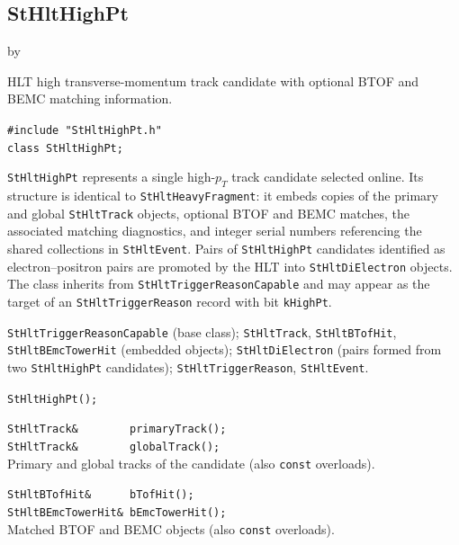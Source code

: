 \documentclass[twoside]{article}
\newcommand{\entrylabel}[1]{\mbox{\textbf{{#1}}}\hfil}%
\newenvironment{entry}
{\begin{list}{}%
    {\renewcommand{\makelabel}{\entrylabel}%
     \setlength{\labelwidth}{90pt}%
     \setlength{\leftmargin}{\labelwidth}
     \advance\leftmargin by \labelsep%
      }%
    }%
  {\end{list}}
\newcommand{\Entrylabel}[1]%
{\raisebox{0pt}[1ex][0pt]{\makebox[\labelwidth][l]%
    {\parbox[t]{\labelwidth}{\hspace{0pt}\textbf{{#1}}}}}}
\newenvironment{Entry}%
{\renewcommand{\entrylabel}{\Entrylabel}\begin{entry}}%
  {\end{entry}}
\begin{document}
\subsection{StHltHighPt}
\label{sec:StHltHighPt}
\begin{Entry}
\item[Summary] HLT high transverse-momentum track candidate with optional
    BTOF and BEMC matching information.
\item[Synopsis]
    \verb+#include "StHltHighPt.h"+\\
    \verb+class StHltHighPt;+\\
\item[Description]
    \texttt{StHltHighPt} represents a single high-$p_T$ track candidate
    selected online.  Its structure is identical to
    \texttt{StHltHeavyFragment}: it embeds copies of the primary and
    global \texttt{StHltTrack} objects, optional BTOF and BEMC matches,
    the associated matching diagnostics, and integer serial numbers
    referencing the shared collections in \texttt{StHltEvent}.  Pairs
    of \texttt{StHltHighPt} candidates identified as electron--positron
    pairs are promoted by the HLT into \texttt{StHltDiElectron}
    objects.  The class inherits from \texttt{StHltTriggerReasonCapable}
    and may appear as the target of an \texttt{StHltTriggerReason}
    record with bit \texttt{kHighPt}.
\item[Related Classes]
    \texttt{StHltTriggerReasonCapable} (base class);
    \texttt{StHltTrack}, \texttt{StHltBTofHit},
    \texttt{StHltBEmcTowerHit} (embedded objects);
    \texttt{StHltDiElectron} (pairs formed from two \texttt{StHltHighPt}
    candidates); \texttt{StHltTriggerReason}, \texttt{StHltEvent}.
\item[Public\\ Constructors]
    \verb+StHltHighPt();+\\
\item[Public Member\\ Functions]
    \verb+StHltTrack&        primaryTrack();+\\
    \verb+StHltTrack&        globalTrack();+\\
    Primary and global tracks of the candidate (also \texttt{const}
    overloads).

    \verb+StHltBTofHit&      bTofHit();+\\
    \verb+StHltBEmcTowerHit& bEmcTowerHit();+\\
    Matched BTOF and BEMC objects (also \texttt{const} overloads).


\end{Entry}
\end{document}
